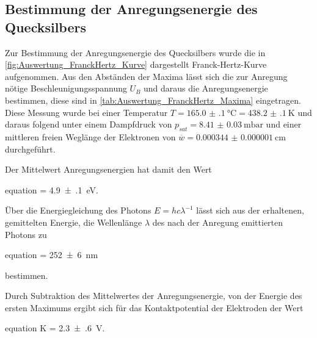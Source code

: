 	
	
	
\subsection{Bestimmung der Anregungsenergie des Quecksilbers}
	
	Zur Bestimmung der Anregungsenergie des Quecksilbers wurde die in \cref{fig:Auswertung_FranckHertz_Kurve}
	dargestellt Franck-Hertz-Kurve aufgenommen. Aus den Abständen der Maxima lässt sich die zur
	Anregung nötige Beschleunigungsspannung $U_{B}$ und daraus die Anregungsenergie bestimmen, diese sind in 
	\cref{tab:Auswertung_FranckHertz_Maxima} eingetragen. Diese Messung wurde bei einer Temperatur
	$T =\SI{165.0(1)}{\degreeCelsius} = \SI{438.2(1)}{\kelvin}$ und daraus folgend unter einem Dampfdruck
	von $p_{sat} = \SI{8.41(3)}{\milli\bar}$ und einer mittleren freien Weglänge der Elektronen 
	von $\overline{w} = \SI{0.000344(1)}{\cm}$ durchgeführt.
	
	
	
	
	
	Der Mittelwert Anregungsenergien hat damit den Wert
	
	\begin{empheq}{equation}
		\label{val:Auswertung_Anregungsenergie}
		 = \SI{4.9(1)}{\eV}.
	\end{empheq}
	
	Über die Energiegleichung des Photons $E = hc\lambda^{-1}$ lässt sich aus der
	erhaltenen, gemittelten Energie, die Wellenlänge $\lambda$ des nach der Anregung emittierten Photons
	zu
	\begin{empheq}{equation}
		\lambda = \SI{252(6)}{\nm}
	\end{empheq}	 	
	bestimmen.
		 	
	Durch Subtraktion des Mittelwertes der Anregungsenergie, von der Energie des ersten Maximums
	ergibt sich für das Kontaktpotential der Elektroden der Wert
	\begin{empheq}{equation}
			K = \SI{2.3(6)}{\volt}.  
			\label{val:Auswertung_K_2}
	\end{empheq}
	  
